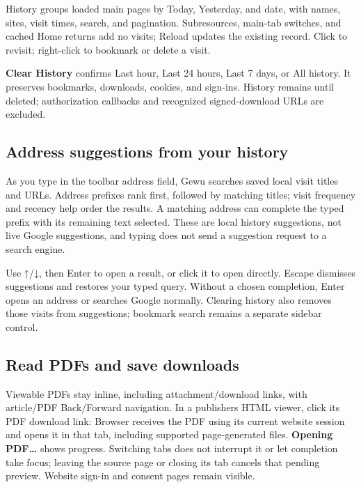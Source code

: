 \documentclass[10pt,letterpaper,oneside]{scrreprt}
\begin{document}
History groups loaded main pages by Today, Yesterday, and date, with names, sites, visit times, search, and pagination. Subresources, main-tab switches, and cached Home returns add no visits; Reload updates the existing record. Click to revisit; right-click to bookmark or delete a visit.

\textbf{Clear History} confirms Last hour, Last 24 hours, Last 7 days, or All history. It preserves bookmarks, downloads, cookies, and sign-ins. History remains until deleted; authorization callbacks and recognized signed-download URLs are excluded.

\subsection{Address suggestions from your history}\label{address-suggestions-from-your-history}

As you type in the toolbar address field, Gewu searches saved local visit titles and URLs. Address prefixes rank first, followed by matching titles; visit frequency and recency help order the results. A matching address can complete the typed prefix with its remaining text selected. These are local history suggestions, not live Google suggestions, and typing does not send a suggestion request to a search engine.

Use {{\symbolfont ↑}}/{{\symbolfont ↓}}, then Enter to open a result, or click it to open directly. Escape dismisses suggestions and restores your typed query. Without a chosen completion, Enter opens an address or searches Google normally. Clearing history also removes those visits from suggestions; bookmark search remains a separate sidebar control.

\subsection{Read PDFs and save downloads}\label{read-pdfs-and-save-downloads}

Viewable PDFs stay inline, including attachment/download links, with article/PDF Back/Forward navigation. In a publisher\textquotesingle s HTML viewer, click its PDF download link: Browser receives the PDF using its current website session and opens it in that tab, including supported page-generated files. \textbf{Opening PDF\ldots{}} shows progress. Switching tabs does not interrupt it or let completion take focus; leaving the source page or closing its tab cancels that pending preview. Website sign-in and consent pages remain visible.
\end{document}
